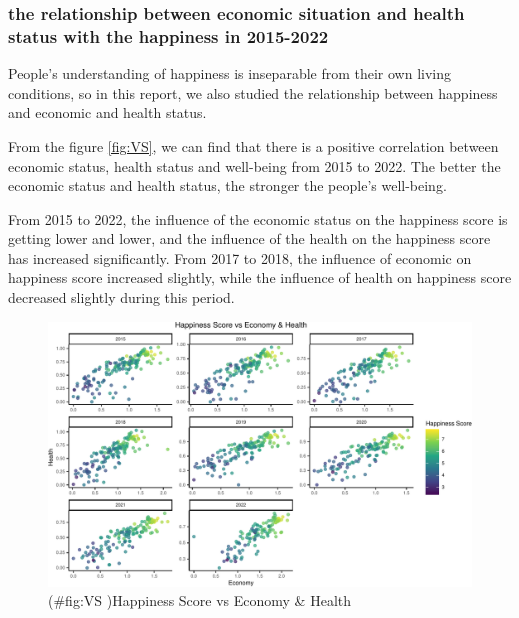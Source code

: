 \documentclass[11pt,a4paper,]{article}
\begin{document}
\hypertarget{the-relationship-between-economic-situation-and-health-status-with-the-happiness-in-2015-2022}{%
\subsubsection{the relationship between economic situation and health status with the happiness in 2015-2022}\label{the-relationship-between-economic-situation-and-health-status-with-the-happiness-in-2015-2022}}

People's understanding of happiness is inseparable from their own living conditions, so in this report, we also studied the relationship between happiness and economic and health status.

From the figure \ref{fig:VS}, we can find that there is a positive correlation between economic status, health status and well-being from 2015 to 2022. The better the economic status and health status, the stronger the people's well-being.

From 2015 to 2022, the influence of the economic status on the happiness score is getting lower and lower, and the influence of the health on the happiness score has increased significantly. From 2017 to 2018, the influence of economic on happiness score increased slightly, while the influence of health on happiness score decreased slightly during this period.

\begin{figure}
\centering
\includegraphics{Assignment4_files/figure-latex/VS -1.pdf}
\caption{(\#fig:VS )Happiness Score vs Economy \& Health}
\end{figure}
\end{document}
